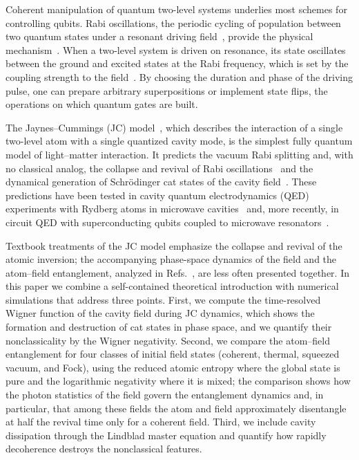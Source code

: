 \documentclass[%
 reprint,
 amsmath,amssymb,
 aps,
 floatfix,
]{revtex4-2}
\begin{document}
Coherent manipulation of quantum two-level systems underlies most schemes for controlling qubits. Rabi oscillations, the periodic cycling of population between two quantum states under a resonant driving field~\cite{rabi1937}, provide the physical mechanism~\cite{scully1997}. When a two-level system is driven on resonance, its state oscillates between the ground and excited states at the Rabi frequency, which is set by the coupling strength to the field~\cite{allen1975, gerry2004}. By choosing the duration and phase of the driving pulse, one can prepare arbitrary superpositions or implement state flips, the operations on which quantum gates are built.

The Jaynes--Cummings (JC) model~\cite{jaynes1963}, which describes the interaction of a single two-level atom with a single quantized cavity mode, is the simplest fully quantum model of light--matter interaction. It predicts the vacuum Rabi splitting and, with no classical analog, the collapse and revival of Rabi oscillations~\cite{eberly1980} and the dynamical generation of Schr\"{o}dinger cat states of the cavity field~\cite{gea-banacloche1990, gea-banacloche1991}. These predictions have been tested in cavity quantum electrodynamics (QED) experiments with Rydberg atoms in microwave cavities~\cite{rempe1987, brune1996rabi, auffeves2003, haroche2006} and, more recently, in circuit QED with superconducting qubits coupled to microwave resonators~\cite{blais2021}.

Textbook treatments of the JC model emphasize the collapse and revival of the atomic inversion; the accompanying phase-space dynamics of the field and the atom--field entanglement, analyzed in Refs.~\cite{gea-banacloche1990, gea-banacloche1991, phoenix1988, phoenix1991}, are less often presented together. In this paper we combine a self-contained theoretical introduction with numerical simulations that address three points. First, we compute the time-resolved Wigner function of the cavity field during JC dynamics, which shows the formation and destruction of cat states in phase space, and we quantify their nonclassicality by the Wigner negativity. Second, we compare the atom--field entanglement for four classes of initial field states (coherent, thermal, squeezed vacuum, and Fock), using the reduced atomic entropy where the global state is pure and the logarithmic negativity where it is mixed; the comparison shows how the photon statistics of the field govern the entanglement dynamics and, in particular, that among these fields the atom and field approximately disentangle at half the revival time only for a coherent field. Third, we include cavity dissipation through the Lindblad master equation and quantify how rapidly decoherence destroys the nonclassical features.
\end{document}
